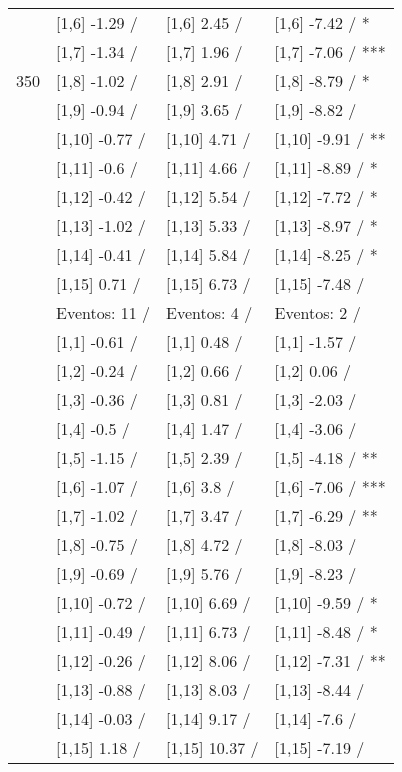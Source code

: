 \begin{table}
\begin{tabular}[t]{llll}
 & {}[1,6] -1.29  / & {}[1,6] 2.45  / & {}[1,6] -7.42  / *\\
 & {}[1,7] -1.34  / & {}[1,7] 1.96  / & {}[1,7] -7.06  / ***\\
350 & {}[1,8] -1.02  / & {}[1,8] 2.91  / & {}[1,8] -8.79  / *\\
\addlinespace
 & {}[1,9] -0.94  / & {}[1,9] 3.65  / & {}[1,9] -8.82  /\\
 & {}[1,10] -0.77  / & {}[1,10] 4.71  / & {}[1,10] -9.91  / **\\
 & {}[1,11] -0.6  / & {}[1,11] 4.66  / & {}[1,11] -8.89  / *\\
 & {}[1,12] -0.42  / & {}[1,12] 5.54  / & {}[1,12] -7.72  / *\\
 & {}[1,13] -1.02  / & {}[1,13] 5.33  / & {}[1,13] -8.97  / *\\
\addlinespace
 & {}[1,14] -0.41  / & {}[1,14] 5.84  / & {}[1,14] -8.25  / *\\
 & {}[1,15] 0.71  / & {}[1,15] 6.73  / & {}[1,15] -7.48  /\\
 & Eventos:  11 / & Eventos:  4 / & Eventos:  2 /\\
 & {}[1,1] -0.61  / & {}[1,1] 0.48  / & {}[1,1] -1.57  /\\
 & {}[1,2] -0.24  / & {}[1,2] 0.66  / & {}[1,2] 0.06  /\\
\addlinespace
 & {}[1,3] -0.36  / & {}[1,3] 0.81  / & {}[1,3] -2.03  /\\
 & {}[1,4] -0.5  / & {}[1,4] 1.47  / & {}[1,4] -3.06  /\\
 & {}[1,5] -1.15  / & {}[1,5] 2.39  / & {}[1,5] -4.18  / **\\
 & {}[1,6] -1.07  / & {}[1,6] 3.8  / & {}[1,6] -7.06  / ***\\
 & {}[1,7] -1.02  / & {}[1,7] 3.47  / & {}[1,7] -6.29  / **\\
\addlinespace
500 & {}[1,8] -0.75  / & {}[1,8] 4.72  / & {}[1,8] -8.03  /\\
 & {}[1,9] -0.69  / & {}[1,9] 5.76  / & {}[1,9] -8.23  /\\
 & {}[1,10] -0.72  / & {}[1,10] 6.69  / & {}[1,10] -9.59  / *\\
 & {}[1,11] -0.49  / & {}[1,11] 6.73  / & {}[1,11] -8.48  / *\\
 & {}[1,12] -0.26  / & {}[1,12] 8.06  / & {}[1,12] -7.31  / **\\
\addlinespace
 & {}[1,13] -0.88  / & {}[1,13] 8.03  / & {}[1,13] -8.44  /\\
 & {}[1,14] -0.03  / & {}[1,14] 9.17  / & {}[1,14] -7.6  /\\
 & {}[1,15] 1.18  / & {}[1,15] 10.37  / & {}[1,15] -7.19  /\\
\bottomrule
\end{tabular}
\end{table}
